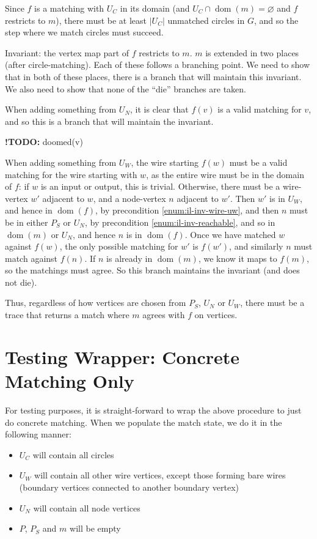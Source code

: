 \documentclass{article}
\DeclareMathOperator{\dom}{dom}
\newcommand{\TODOinline}[1]{%
\typeout{WARNING!!! there is still a TODO left}
{\color{blue}\textbf{!TODO: }#1}
}
\begin{document}
Since $f$ is a matching with $U_C$ in its domain (and $U_C\cap\dom(m) = \varnothing$ and $f$ restricts to $m$), there must be at least $|U_C|$ unmatched circles in $G$, and so the step where we match circles must succeed.

Invariant: the vertex map part of $f$ restricts to $m$.  $m$ is extended in two places (after circle-matching).  Each of these follows a branching point.  We need to show that in both of these places, there is a branch that will maintain this invariant.  We also need to show that none of the ``die'' branches are taken.

When adding something from $U_N$, it is clear that $f(v)$ is a valid matching for $v$, and so this is a branch that will maintain the invariant.

\TODOinline{doomed(v)}

When adding something from $U_W$, the wire starting $f(w)$ must be a valid matching for the wire starting with $w$, as the entire wire must be in the domain of $f$: if $w$ is an input or output, this is trivial.  Otherwise, there must be a wire-vertex $w'$ adjacent to $w$, and a node-vertex $n$ adjacent to $w'$.  Then $w'$ is in $U_W$, and hence in $\dom(f)$, by precondition \ref{enum:il-inv-wire-uw}, and then $n$ must be in either $P_S$ or $U_N$, by precondition \ref{enum:il-inv-reachable}, and so in $\dom(m)$ or $U_N$, and hence $n$ is in $\dom(f)$.  Once we have matched $w$ against $f(w)$, the only possible matching for $w'$ is $f(w')$, and similarly $n$ must match against $f(n)$.  If $n$ is already in $\dom(m)$, we know it maps to $f(m)$, so the matchings must agree.  So this branch maintains the invariant (and does not die).

Thus, regardless of how vertices are chosen from $P_S$, $U_N$ or $U_W$, there must be a trace that returns a match where $m$ agrees with $f$ on vertices.


\section{Testing Wrapper: Concrete Matching Only}
\label{sec:test-wrapper}

For testing purposes, it is straight-forward to wrap the above procedure to just do concrete matching.  When we populate the match state, we do it in the following manner:
\begin{itemize}
\item $U_C$ will contain all circles
\item $U_W$ will contain all other wire vertices, except those forming bare wires (boundary vertices connected to another boundary vertex)
\item $U_N$ will contain all node vertices
\item $P$, $P_S$ and $m$ will be empty
\end{itemize}
\end{document}
